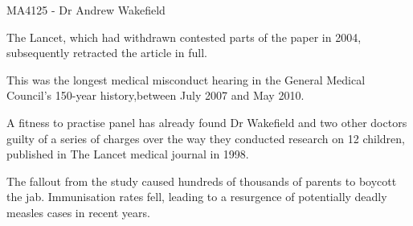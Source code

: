 MA4125 - Dr Andrew Wakefield

The Lancet, which had withdrawn contested parts of the paper in 2004, subsequently retracted the article in full.
 
This was the longest medical misconduct hearing in the General Medical Council’s 150-year history,between July 2007 and May 2010.
 
A fitness to practise panel has already found Dr Wakefield and two other doctors guilty of a series of charges over the way they conducted research on 12 children, published in The Lancet medical journal in 1998.
 
The fallout from the study caused hundreds of thousands of parents to boycott the jab. Immunisation rates fell, leading to a resurgence of potentially deadly measles cases in recent years.
 
